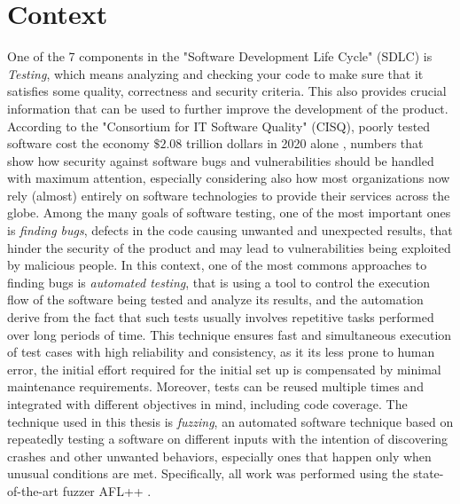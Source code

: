 \section{Context}
One of the 7 components in the "Software Development Life Cycle" (SDLC) is \textit{Testing}, which means analyzing and checking your code to make sure that it satisfies some quality, correctness and security criteria. This also provides crucial information that can be used to further improve the development of the product.
\newline
According to the "Consortium for IT Software Quality" (CISQ), poorly tested software cost the economy $\$2.08$ trillion dollars in 2020 alone \cite{forbes}, numbers that show how security against software bugs and vulnerabilities should be handled with maximum attention, especially considering also how most organizations now rely (almost) entirely on software technologies to provide their services across the globe.
\newline
Among the many goals of software testing, one of the most important ones is \textit{finding bugs}, defects in the code causing unwanted and unexpected results, that hinder the security of the product and may lead to vulnerabilities being exploited by malicious people.
\newline
In this context, one of the most commons approaches to finding bugs is \textit{automated testing}, that is using a tool to control the execution flow of the software being tested and analyze its results, and the automation derive from the fact that such tests usually involves repetitive tasks performed over long periods of time. This technique ensures fast and simultaneous execution of test cases with high reliability and consistency, as it its less prone to human error, the initial effort required for the initial set up is compensated by minimal maintenance requirements. Moreover, tests can be reused multiple times and integrated with different objectives in mind, including code coverage.
\newline
The technique used in this thesis is \textit{fuzzing}, an automated software technique based on repeatedly testing a software on different inputs with the intention of discovering crashes and other unwanted behaviors, especially ones that happen only when unusual conditions are met.
\newline
Specifically, all work was performed using the state-of-the-art fuzzer AFL++ \cite{AFL}.




\ \\
